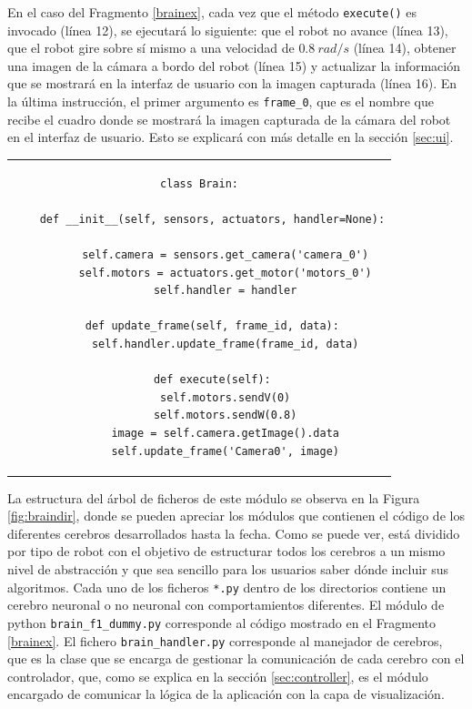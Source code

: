 En el caso del Fragmento \ref{brainex}, cada vez que el método \lstinline{execute()} es invocado (línea 12), se ejecutará lo siguiente: que el robot no avance (línea 13), que el robot gire sobre sí mismo a una velocidad de $0.8\ rad/s$ (línea 14), obtener una imagen de la cámara a bordo del robot (línea 15) y actualizar la información que se mostrará en la interfaz de usuario con la imagen capturada (línea 16). En la última instrucción, el primer argumento es \lstinline{frame_0}, que es el nombre que recibe el cuadro donde se mostrará la imagen capturada de la cámara del robot en el interfaz de usuario. Esto se explicará con más detalle en la sección \ref{sec:ui}.

\begin{tabular}{c}
\begin{lstlisting}[caption={Ejemplo de implementación de cerebro no neuronal},captionpos=b,label=brainex,style=Python] 
class Brain:
    
    def __init__(self, sensors, actuators, handler=None):
       
        self.camera = sensors.get_camera('camera_0')
        self.motors = actuators.get_motor('motors_0')
        self.handler = handler

    def update_frame(self, frame_id, data):
        self.handler.update_frame(frame_id, data)

    def execute(self):
        self.motors.sendV(0)
        self.motors.sendW(0.8)
        image = self.camera.getImage().data
        self.update_frame('Camera0', image)
\end{lstlisting}
\end{tabular}


La estructura del árbol de ficheros de este módulo se observa en la Figura \ref{fig:braindir}, donde se pueden apreciar los módulos que contienen el código de los diferentes cerebros desarrollados hasta la fecha. Como se puede ver, está dividido por tipo de robot con el objetivo de estructurar todos los cerebros a un mismo nivel de abstracción y que sea sencillo para los usuarios saber dónde incluir sus algoritmos. Cada uno de los ficheros \lstinline{*.py} dentro de los directorios contiene un cerebro neuronal o no neuronal con comportamientos diferentes. El módulo de python \lstinline{brain_f1_dummy.py} corresponde al código mostrado en el Fragmento \ref{brainex}. El fichero \lstinline{brain_handler.py} corresponde al manejador de cerebros, que es la clase que se encarga de gestionar la comunicación de cada cerebro con el controlador, que, como se explica en la sección \ref{sec:controller}, es el módulo encargado de comunicar la lógica de la aplicación con la capa de visualización.

